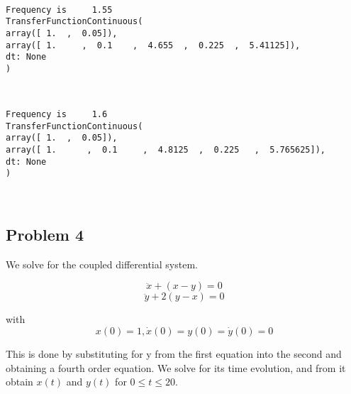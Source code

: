 \documentclass[11pt]{article}
\begin{document}
    \begin{center}
    \end{center}
    { \hspace*{\fill} \\}
    
    \begin{Verbatim}[commandchars=\\\{\}]
Frequency is 	 1.55
TransferFunctionContinuous(
array([ 1.  ,  0.05]),
array([ 1.     ,  0.1    ,  4.655  ,  0.225  ,  5.41125]),
dt: None
)

    \end{Verbatim}

    \begin{center}
    \end{center}
    { \hspace*{\fill} \\}
    
    \begin{Verbatim}[commandchars=\\\{\}]
Frequency is 	 1.6
TransferFunctionContinuous(
array([ 1.  ,  0.05]),
array([ 1.      ,  0.1     ,  4.8125  ,  0.225   ,  5.765625]),
dt: None
)

    \end{Verbatim}

    \begin{center}
    \end{center}
    { \hspace*{\fill} \\}
    
    \hypertarget{problem-4}{%
\subsection{Problem 4}\label{problem-4}}

We solve for the coupled differential system.

\[\ddot{x}+(x−y) = 0\] \[\ddot{y}+2(y−x) = 0\]

with \[x(0) = 1, \dot{x}(0) = y(0) = \dot{y}(0) = 0\]

This is done by substituting for y from the first equation into the
second and obtaining a fourth order equation. We solve for its time
evolution, and from it obtain \(x(t)\) and \(y(t)\) for \(0 ≤ t ≤ 20\).
\end{document}
